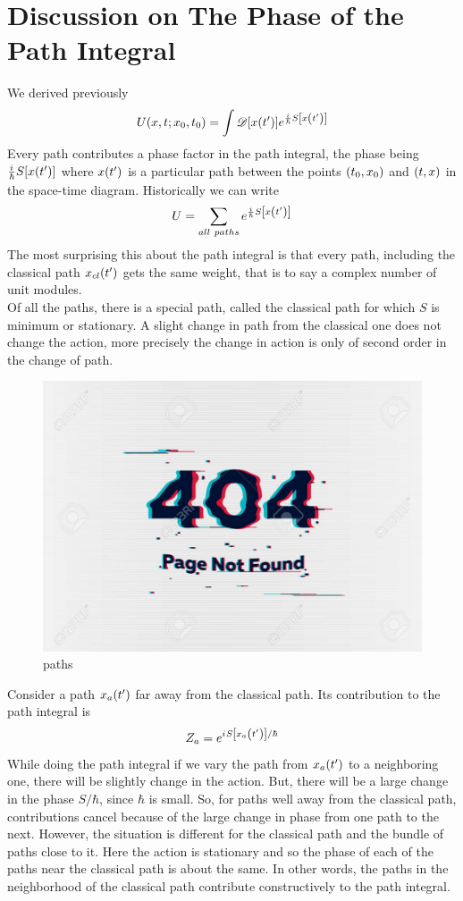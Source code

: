 		
		
		\section{Discussion on The Phase of the Path Integral}
		We derived previously
		\begin{equation}
			U\qty(x,t;x_0, t_0) = \int \mathcal{D}\qty[x\qty(t^\prime)] e^{\frac{{i\mkern1mu}}{\hbar} S\qty[x\qty(t^\prime)]}
		\end{equation}
		Every path contributes a phase factor in the path integral, the phase being $\frac{{i\mkern1mu}}{\hbar} S\qty[x\qty(t^\prime)]$ where $x\qty(t^\prime)$ is a particular path between the points $\qty(t_0, x_0)$ and $\qty(t,x)$ in the space-time diagram. Historically we can write
		\begin{equation}
			U = \sum_{all\ paths} e^{\frac{{i\mkern1mu}}{\hbar} S\qty[x\qty(t^\prime)]}
		\end{equation}
		The most surprising this about the path integral is that every path, including the classical path $x_{cl}\qty(t^\prime)$ gets the same weight, that is to say a complex number of unit modules.\\
		
		
		Of all the paths, there is a special path, called the classical path for which $S$ is minimum or stationary. A slight change in path from the classical one does not change the action, more precisely the change in action is only of second order in the change of path.
		
		
		\begin{figure}
			\centering
			\includegraphics[width=0.5\linewidth]{Pictures/not-found.jpg}
			\caption{paths}
		\end{figure}
	
	
	Consider a path $x_a\qty(t^\prime)$ far away from the classical path. Its contribution to the path integral is
	\begin{equation}
		Z_a = e^{{i\mkern1mu} S\qty[x_a\qty(t^\prime)] / \hbar}
	\end{equation}
	While doing the path integral if we vary the path from $x_a\qty(t^\prime)$ to a neighboring one, there will be slightly change in the action. But, there will be a large change in the phase $S/\hbar$, since $\hbar$ is small. So, for paths well away from the classical path, contributions cancel because of the large change in phase from one path to the next. However, the situation is different for the classical path and the bundle of paths close to it. Here the action is stationary and so the phase of each of the paths near the classical path is about the same. In other words, the paths in the neighborhood of the classical path contribute constructively to the path integral.\\
	

